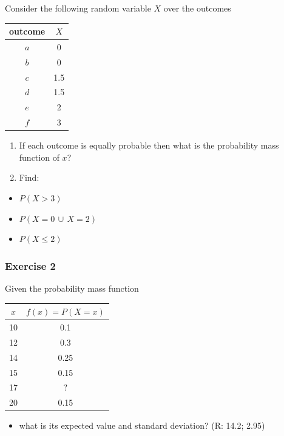 \documentclass[
]{book}
\providecommand{\tightlist}{%
  \setlength{\itemsep}{0pt}\setlength{\parskip}{0pt}}
\begin{document}
Consider the following random variable \(X\) over the outcomes

\begin{longtable}[]{@{}cc@{}}
\toprule
outcome & \(X\) \\
\midrule
\endhead
\(a\) & 0 \\
\(b\) & 0 \\
\(c\) & 1.5 \\
\(d\) & 1.5 \\
\(e\) & 2 \\
\(f\) & 3 \\
\bottomrule
\end{longtable}

\begin{enumerate}
\def\labelenumi{\alph{enumi})}
\item
  If each outcome is equally probable then what is the probability mass function of \(x\)?
\item
  Find:
\end{enumerate}

\begin{itemize}
\tightlist
\item
  \(P(X>3)\)
\item
  \(P(X=0\, \cup \, X=2 )\)
\item
  \(P(X \leq 2)\)
\end{itemize}

\hypertarget{exercise-2-2}{%
\subsubsection{Exercise 2}\label{exercise-2-2}}

Given the probability mass function

\begin{longtable}[]{@{}cc@{}}
\toprule
\(x\) & \(f(x)=P(X=x)\) \\
\midrule
\endhead
10 & 0.1 \\
12 & 0.3 \\
14 & 0.25 \\
15 & 0.15 \\
17 & ? \\
20 & 0.15 \\
\bottomrule
\end{longtable}

\begin{itemize}
\tightlist
\item
  what is its expected value and standard deviation? (R: 14.2; 2.95)
\end{itemize}
\end{document}
